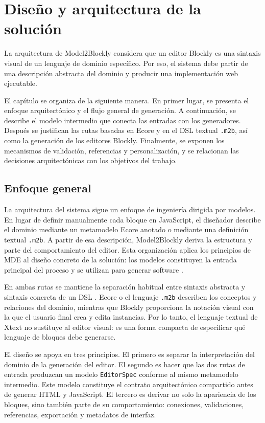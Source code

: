 \chapter{Diseño y arquitectura de la solución}
\label{chap:diseno-arquitectura}

La arquitectura de Model2Blockly considera que un editor Blockly es una sintaxis
visual de un lenguaje de dominio específico. Por eso, el sistema debe partir de
una descripción abstracta del dominio y producir una implementación web ejecutable.

El capítulo se organiza de la siguiente manera. En primer lugar, se presenta el
enfoque arquitectónico y el flujo general de generación. A continuación, se
describe el modelo intermedio que conecta las entradas con los generadores.
Después se justifican las rutas basadas en Ecore y en el DSL textual
\texttt{.m2b}, así como la generación de los editores Blockly. Finalmente, se
exponen los mecanismos de validación, referencias y personalización, y se
relacionan las decisiones arquitectónicas con los objetivos del trabajo.

\section{Enfoque general}
\label{sec:enfoque-arquitectonico}

La arquitectura del sistema sigue un enfoque de ingeniería dirigida por modelos.
En lugar de definir manualmente cada bloque en JavaScript, el diseñador describe
el dominio mediante un metamodelo Ecore anotado o mediante una definición
textual \texttt{.m2b}. A partir de esa descripción, Model2Blockly deriva la
estructura y parte del comportamiento del editor. Esta organización aplica los
principios de MDE al diseño concreto de la solución: los modelos constituyen la
entrada principal del proceso y se utilizan para generar software
\cite{brambilla2017modelDriven}.

En ambas rutas se mantiene la separación habitual entre sintaxis abstracta y
sintaxis concreta de un DSL \cite{sal2024dsl}. Ecore o el lenguaje
\texttt{.m2b} describen los conceptos y relaciones del dominio, mientras que
Blockly proporciona la notación visual con la que el usuario final crea y edita
instancias. Por lo tanto, el lenguaje textual de Xtext no sustituye al editor
visual: es una forma compacta de especificar qué lenguaje de bloques debe
generarse.

El diseño se apoya en tres principios. El primero es separar la interpretación
del dominio de la generación del editor. El segundo es hacer que las dos rutas
de entrada produzcan un modelo \texttt{EditorSpec} conforme al mismo metamodelo
intermedio. Este modelo constituye el contrato arquitectónico compartido antes
de generar HTML y JavaScript. El tercero es derivar no solo la apariencia de los
bloques, sino también parte de su comportamiento: conexiones, validaciones,
referencias, exportación y metadatos de interfaz.

